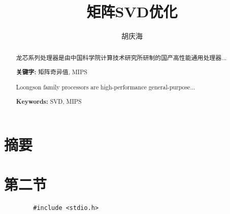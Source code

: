 \documentclass[12pt,a4paper]{article}
\begin{document}
\begin{CJK}{UTF8}{gbsn}

\title{矩阵SVD优化}
\author{胡庆海}
\date{}
\maketitle
\newpage

\tableofcontents %
\newpage
\listoffigures  %
\newpage
\listoftables   %

\newpage
\section{摘要}
\begin{abstract}
	龙芯系列处理器是由中国科学院计算技术研究所研制的国产高性能通用处理器...

\textbf{关键字:} 矩阵奇异值, MIPS
\end{abstract}
\newpage

\begin{abstract}
	Loongson family processors are high-performance general-purpose...

\textbf{Keywords:} SVD, MIPS
\end{abstract}
\newpage

\section{第二节}
		\begin{lstlisting}
		#include <stdio.h>
		\end{lstlisting}
\end{CJK}
\end{document}
